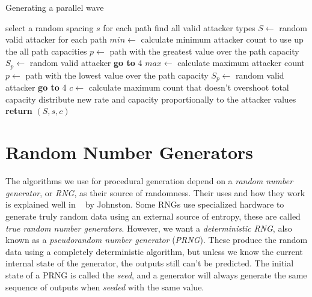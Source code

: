 \begin{algorithm}[H]
    \caption{Generating a parallel wave}
    \label{alg:wave-parallel}
    \begin{algorithmic}[1]
        \State select a random spacing $s$
        \State for each path find all valid attacker types
        \State $S \gets$ random valid attacker for each path
        \Statex
        \State $min \gets$ calculate minimum attacker count to use up the all path capacities
        \State $p \gets$ path with the greatest value over the path capacity
        \State $S_p \gets$ random valid attacker
        \State \textbf{go to} 4 
        \EndIf
        \Statex
        \State $max \gets$ calculate maximum attacker count
        \State $p \gets$ path with the lowest value over the path capacity
        \State $S_p \gets$ random valid attacker
        \State \textbf{go to} 4 
        \EndIf
        \Statex
        \State $c \gets$ calculate maximum count that doesn't overshoot total capacity
        \State distribute new rate and capacity proportionally to the attacker values
        \State \textbf{return} $(S, s, c)$
        \Statex
    \end{algorithmic}
\end{algorithm}

\section{Random Number Generators}\label{sec:analysis-rng}

The algorithms we use for procedural generation depend on a \emph{random number generator}, or \emph{RNG}, as their source of randomness.
Their uses and how they work is explained well in ~\cite{johnston2018random} by Johnston.
Some RNGs use specialized hardware to generate truly random data using an external source of entropy, these are called \emph{true random number generators}.
However, we want a \emph{deterministic RNG}, also known as a \emph{pseudorandom number generator} (\emph{PRNG}).
These produce the random data using a completely deterministic algorithm, but unless we know the current internal state of the generator, the outputs still can't be predicted.
The initial state of a PRNG is called the \emph{seed}, and a generator will always generate the same sequence of outputs when \emph{seeded} with the same value.

